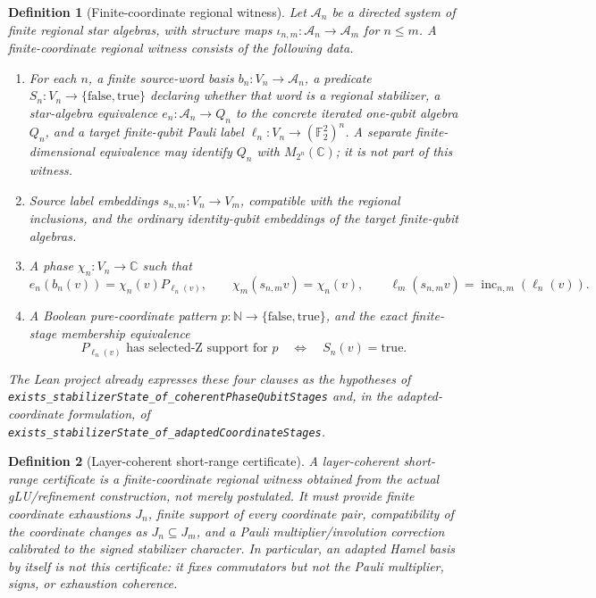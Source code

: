 \documentclass{article}
\newtheorem{definition}{Definition}
\newcommand{\cA}{\mathcal A}
\begin{document}
\begin{definition}[Finite-coordinate regional witness]
Let \(\cA_n\) be a directed system of finite regional star algebras, with
structure maps \(\iota_{n,m}:\cA_n\to\cA_m\) for \(n\leq m\).  A
finite-coordinate regional witness consists of the following data.
\begin{enumerate}
\item For each \(n\), a finite source-word basis \(b_n:V_n\to\cA_n\), a
  predicate \(S_n:V_n\to\{\mathrm{false},\mathrm{true}\}\) declaring whether
  that word is a regional stabilizer, a star-algebra equivalence
  \(e_n:\cA_n\to Q_n\) to the concrete iterated one-qubit algebra \(Q_n\),
  and a target finite-qubit Pauli label
  \(\ell_n:V_n\to (\mathbb F_2^2)^n\).  A separate finite-dimensional
  equivalence may identify \(Q_n\) with \(M_{2^n}(\mathbb C)\); it is not
  part of this witness.
\item Source label embeddings \(s_{n,m}:V_n\to V_m\), compatible with the
  regional inclusions, and the ordinary identity-qubit embeddings of the
  target finite-qubit algebras.
\item A phase \(\chi_n:V_n\to\mathbb C\) such that
\begin{equation}
 e_n(b_n(v))=\chi_n(v)P_{\ell_n(v)},
 \qquad
 \chi_m(s_{n,m}v)=\chi_n(v),
 \qquad
 \ell_m(s_{n,m}v)=\operatorname{inc}_{n,m}(\ell_n(v)).
\end{equation}
\item A Boolean pure-coordinate pattern \(p:\mathbb N\to\{\mathrm{false},
\mathrm{true}\}\), and the exact finite-stage membership equivalence
\begin{equation}
  P_{\ell_n(v)}\text{ has selected-Z support for }p
  \quad\Longleftrightarrow\quad
  S_n(v)=\mathrm{true}.
  \label{eq:stage_membership}
\end{equation}
\end{enumerate}
The Lean project already expresses these four clauses as the hypotheses of
\texttt{exists\_stabilizerState\_of\_coherentPhaseQubitStages} and, in the
adapted-coordinate formulation, of
\texttt{exists\_stabilizerState\_of\_adaptedCoordinateStages}.
\end{definition}

\begin{definition}[Layer-coherent short-range certificate]
A layer-coherent short-range certificate is a finite-coordinate regional
witness obtained from the actual gLU/refinement construction, not merely
postulated.  It must provide finite coordinate exhaustions \(J_n\), finite
support of every coordinate pair, compatibility of the coordinate changes as
\(J_n\subseteq J_m\), and a Pauli multiplier/involution correction calibrated
to the signed stabilizer character.  In particular, an adapted Hamel basis by
itself is not this certificate: it fixes commutators but not the Pauli
multiplier, signs, or exhaustion coherence.
\end{definition}
\end{document}
